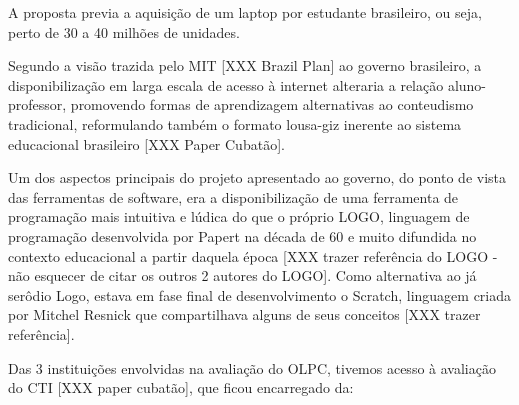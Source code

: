 \documentclass[
12pt,		%
openright,	%
twoside,  %
a4paper,			%
chapter=TITLE,		%
english,			%
french,				%
spanish,			%
brazil				%
]{USPSC-classe/USPSC}
\begin{document}
A proposta previa a aquisi\c{c}\~ao de um \textquotedbl laptop por estudante brasileiro, ou seja, perto de 30 a 40 milh\~oes de unidades.














Segundo a vis\~ao trazida pelo MIT [XXX Brazil Plan] ao governo brasileiro, a disponibiliza\c{c}\~ao em larga escala de acesso \`a internet alteraria a rela\c{c}\~ao aluno-professor, promovendo formas de aprendizagem alternativas ao conteudismo tradicional, reformulando tamb\'em o formato lousa-giz inerente ao sistema educacional brasileiro [XXX Paper Cubat\~ao].














Um dos aspectos principais do projeto apresentado ao governo, do ponto de vista das ferramentas de software, era a disponibiliza\c{c}\~ao de uma ferramenta de programa\c{c}\~ao mais intuitiva e l\'udica do que o pr\'oprio LOGO, linguagem de programa\c{c}\~ao desenvolvida por Papert na d\'ecada de 60 e muito difundida no contexto educacional a partir daquela \'epoca [XXX trazer refer\^encia do LOGO - n\~ao esquecer de citar os outros 2 autores do LOGO]. Como alternativa ao j\'a ser\^odio Logo, estava em fase final de desenvolvimento o Scratch, linguagem criada por Mitchel Resnick que compartilhava alguns de seus conceitos [XXX trazer refer\^encia].














Das 3 institui\c{c}\~oes envolvidas na avalia\c{c}\~ao do OLPC, tivemos acesso \`a avalia\c{c}\~ao do CTI [XXX paper cubat\~ao], que ficou encarregado da:
\end{document}
